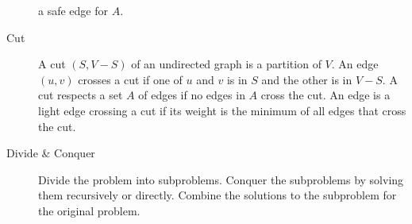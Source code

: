 \documentclass[8pt]{article}
\begin{document}
\begin{multicols}{2}
\begin{description}
  a safe edge for $A$.
\item[Cut] A cut $(S,V-S)$ of an undirected graph is a partition of
  $V$. An edge $(u,v)$ crosses a cut if one of $u$ and $v$ is in $S$
  and the other is in $V-S$. A cut respects a set $A$ of edges if no
  edges in $A$ cross the cut. An edge is a light edge crossing a cut
  if its weight is the minimum of all edges that cross the cut.
\item[Divide \& Conquer] Divide the problem into subproblems. Conquer
  the subproblems by solving them recursively or directly. Combine the
  solutions to the subproblem for the original problem.
  \end{description} %
\end{multicols}
\end{document}
